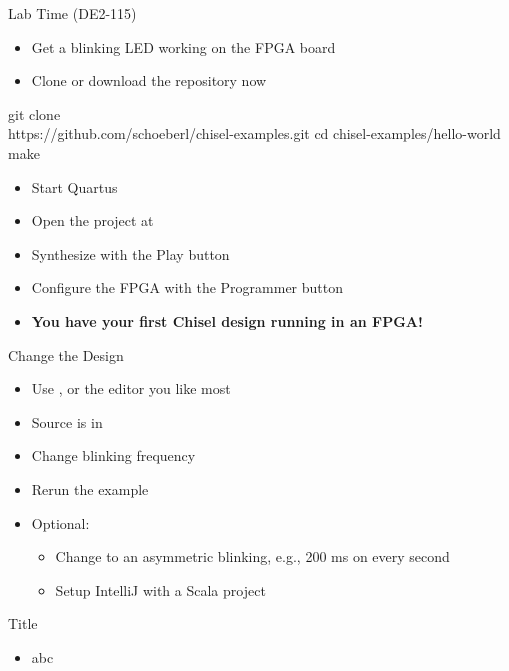 \begin{frame}[fragile]{Lab Time (DE2-115)}
\begin{itemize}
\item Get a blinking LED working on the FPGA board
\item Clone or download the repository now
\end{itemize}
\begin{chisel}
git clone \\
   https://github.com/schoeberl/chisel-examples.git
cd chisel-examples/hello-world
make
\end{chisel}
\begin{itemize}
\item Start Quartus
\item Open the project at 
\item Synthesize with the Play button
\item Configure the FPGA with the Programmer button
\item {\bf You have your first Chisel design running in an FPGA!}
\end{itemize}
\end{frame}

\begin{frame}[fragile]{Change the Design}
\begin{itemize}
\item Use , or the editor you like most
\item Source is in 
\item Change blinking frequency
\item Rerun the example
\item Optional:
\begin{itemize}
\item Change to an asymmetric blinking, e.g., 200 ms on every second 
\item Setup IntelliJ with a Scala project
\end{itemize}
\end{itemize}
\end{frame}




\begin{frame}[fragile]{Title}
\begin{itemize}
\item abc
\end{itemize}
\end{frame}
